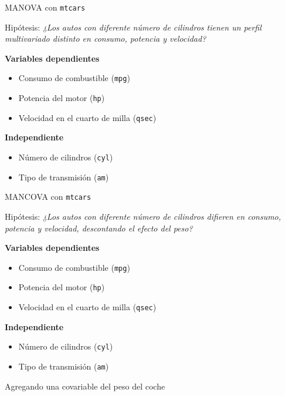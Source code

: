 \documentclass[11pt]{beamer}
\begin{document}
\begin{frame}{MANOVA con \texttt{mtcars}}
	\begin{block}{Hipótesis:}
    		\textit{¿Los autos con diferente número de cilindros tienen un perfil multivariado distinto en consumo, potencia y velocidad?}
	\end{block}
	
	\begin{block}{\textbf{Variables dependientes}}	
    		\begin{itemize}
        		\item Consumo de combustible (\texttt{mpg})
        		\item Potencia del motor (\texttt{hp})
        		\item Velocidad en el cuarto de milla (\texttt{qsec})
    		\end{itemize}
	\end{block}

	\begin{block}{\textbf{Independiente}}
	
    \begin{itemize}
        \item Número de cilindros (\texttt{cyl})
        \item Tipo de transmisión (\texttt{am})
    \end{itemize}
	\end{block}
    
\end{frame}


\begin{frame}{MANCOVA con \texttt{mtcars}}
	\begin{block}{Hipótesis:}
    		\textit{¿Los autos con diferente número de cilindros difieren en consumo, potencia y velocidad, descontando el efecto del peso?}
	\end{block}
	
	\begin{block}{\textbf{Variables dependientes}}	
    		\begin{itemize}
        		\item Consumo de combustible (\texttt{mpg})
        		\item Potencia del motor (\texttt{hp})
        		\item Velocidad en el cuarto de milla (\texttt{qsec})
    		\end{itemize}
	\end{block}

	\begin{block}{\textbf{Independiente}}
	
    \begin{itemize}
        \item Número de cilindros (\texttt{cyl})
        \item Tipo de transmisión (\texttt{am})
    \end{itemize}
    Agregando una covariable del peso del coche
	\end{block}
    
\end{frame}
\end{document}
